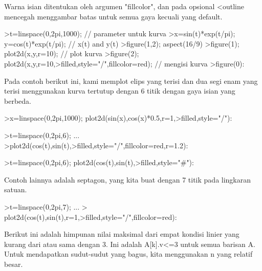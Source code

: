 \documentclass[12pt,Times new roman,letterpaper]{book}
\begin{document}
\begin{eulernootebook}
\begin{eulercomment}
\begin{eulercomment}
\begin{eulernootebook}
\begin{eulercomment}
\begin{eulercomment}
\begin{eulercomment}
\begin{eulercomment}
\begin{eulercomment}
\begin{eulercomment}
\begin{eulercomment}
\begin{eulernotebook}
\begin{eulercomment}
\begin{eulercomment}
\begin{eulercomment}
\begin{eulercomment}
\begin{eulercomment}
Warna isian ditentukan oleh argumen "fillcolor", dan pada opsional
\textless{}outline mencegah menggambar batas untuk semua gaya kecuali yang
default.
\end{eulercomment}
\begin{eulerprompt}
>t=linspace(0,2pi,1000); // parameter untuk kurva
>x=sin(t)*exp(t/pi); y=cos(t)*exp(t/pi); // x(t) and y(t)
>figure(1,2); aspect(16/9)
>figure(1); plot2d(x,y,r=10); // plot kurva
>figure(2); plot2d(x,y,r=10,>filled,style="/",fillcolor=red); // mengisi kurva
>figure(0):
\end{eulerprompt}
\begin{eulercomment}
Pada contoh berikut ini, kami memplot elips yang terisi dan dua segi
enam yang terisi menggunakan kurva tertutup dengan 6 titik dengan gaya
isian yang berbeda.
\end{eulercomment}
\begin{eulerprompt}
>x=linspace(0,2pi,1000); plot2d(sin(x),cos(x)*0.5,r=1,>filled,style="/"):
\end{eulerprompt}
\begin{eulerprompt}
>t=linspace(0,2pi,6); ...
>plot2d(cos(t),sin(t),>filled,style="/",fillcolor=red,r=1.2):
\end{eulerprompt}
\begin{eulerprompt}
>t=linspace(0,2pi,6); plot2d(cos(t),sin(t),>filled,style="#"):
\end{eulerprompt}
\begin{eulercomment}
Contoh lainnya adalah septagon, yang kita buat dengan 7 titik pada
lingkaran satuan.
\end{eulercomment}
\begin{eulerprompt}
>t=linspace(0,2pi,7);  ...
> plot2d(cos(t),sin(t),r=1,>filled,style="/",fillcolor=red):
\end{eulerprompt}
\begin{eulercomment}
Berikut ini adalah himpunan nilai maksimal dari empat kondisi linier
yang kurang dari atau sama dengan 3. Ini adalah A[k].v\textless{}=3 untuk semua
barisan A. Untuk mendapatkan sudut-sudut yang bagus, kita menggunakan
n yang relatif besar.

\end{eulercomment}
\end{eulercomment}
\end{eulercomment}
\end{eulercomment}
\end{eulercomment}
\end{eulernotebook}
\end{eulercomment}
\end{eulercomment}
\end{eulercomment}
\end{eulercomment}
\end{eulercomment}
\end{eulercomment}
\end{eulercomment}
\end{eulernootebook}
\end{eulercomment}
\end{eulercomment}
\end{eulernootebook}
\end{document}
